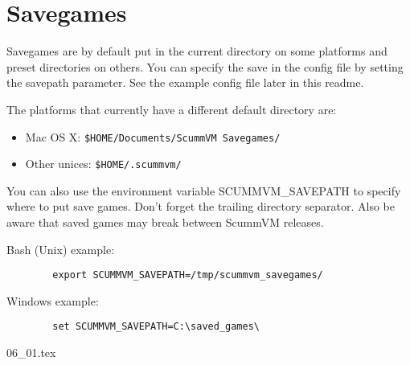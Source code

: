 \section {Savegames}
Savegames are by default put in the current directory on some platforms and
preset directories on others.  You can specify the save in the config file by
setting the savepath parameter. See the example config file later in this
readme.

The platforms that currently have a different default directory are:
%
\begin{itemize}
\item Mac OS X: \verb#$HOME/Documents/ScummVM Savegames/#
\item Other unices: \verb#$HOME/.scummvm/#
\end{itemize}
%
You can also use the environment variable SCUMMVM\_SAVEPATH to specify where to
put save games. Don't forget the trailing directory separator. Also be aware
that saved games may break between ScummVM releases.

Bash (Unix) example:
\begin{verbatim}
        export SCUMMVM_SAVEPATH=/tmp/scummvm_savegames/
\end{verbatim}
Windows example:
\begin{verbatim}
        set SCUMMVM_SAVEPATH=C:\saved_games\
\end{verbatim}

 {06_01.tex}
